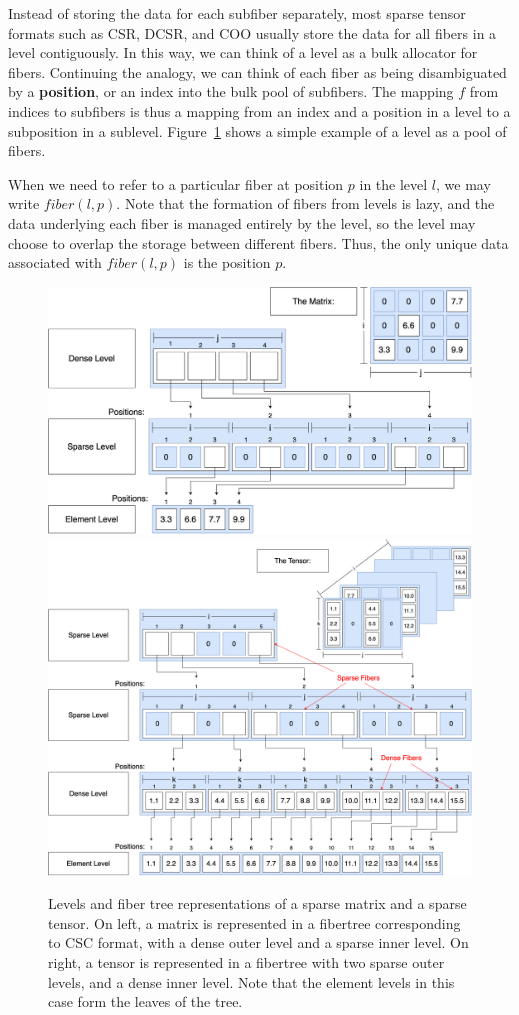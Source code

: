 Instead of storing the data for each subfiber separately, most sparse tensor
formats such as CSR, DCSR, and COO usually store the data for all fibers in a
level contiguously. In this way, we can think of a level as a bulk allocator for
fibers. Continuing the analogy, we can think of each fiber as being
disambiguated by a \textbf{position}, or an index into the bulk pool of
subfibers. The mapping $f$ from indices to subfibers is thus a mapping from an
index and a position in a level to a subposition in a sublevel.
Figure~\ref{fig:levelsvsfibers} shows a simple example of a level as a pool of fibers.

When we need to refer to a particular fiber at position $p$ in the level $l$, we
may write $fiber(l, p)$. Note that the formation of fibers from levels is lazy,
and the data underlying each fiber is managed entirely by the level, so the
level may choose to overlap the storage between different fibers. Thus, the only
unique data associated with $fiber(l, p)$ is the position $p$.

\begin{figure}
    \centering
    \includegraphics[width=0.45\linewidth]{LevelsVsFibers-matrix.png}\hfill%
    \includegraphics[width=0.5\linewidth]{LevelsVsFibers-tensor.png}
    \caption{Levels and fiber tree representations of a sparse matrix and a sparse tensor. On left, a matrix is represented in a fibertree corresponding to CSC format, with a dense outer level and a sparse inner level. On right, a tensor is represented in a fibertree with two sparse outer levels, and a dense inner level. Note that the element levels in this case form the leaves of the tree.}
    \label{fig:levelsvsfibers}
\end{figure}

